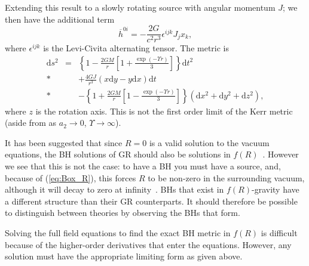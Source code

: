 \documentclass[aps,prd,amsfonts,amssymb,amsmath,nofootinbib,reprint,showpacs]{revtex4-1}
\newcommand{\eqnref}[1]{(\ref{eq:#1})}
\newcommand{\dd}{\ensuremath{\text{d}}}
\begin{document}
Extending this result to a slowly rotating source with angular momentum $J$; we then have the additional term~\cite{Hobson2006}
\begin{equation}
\overline{h}^{0i} = -\frac{2G}{c^2r^3} \epsilon^{ijk}J_j x_k,
\end{equation}
where $\epsilon^{ijk}$ is the Levi-Civita alternating tensor. The metric is
\begin{eqnarray}
\dd s^2 & = & \left\{1-\frac{2GM}{r}\left[1 + \frac{\exp(- \Upsilon r)}{3}\right]\right\}\dd t^2 \nonumber \\*
& & + {} \frac{4GJ}{r^3}\left(x\dd y - y\dd x\right)\dd t \nonumber \\*
& & - {} \left\{1 +\frac{2GM}{r}\left[1 - \frac{\exp(- \Upsilon r)}{3}\right]\right\}\left(\dd x^2 + \dd y^2 + \dd z^2\right),
\end{eqnarray}
where $z$ is the rotation axis. This is not the first order limit of the Kerr metric (aside from as $a_2 \rightarrow 0$, $\Upsilon \rightarrow \infty$).

It has been suggested that since $R = 0$ is a valid solution to the vacuum equations, the BH solutions of GR should also be solutions in $f(R)$~\cite{Psaltis2008, Barausse2008}. However we see that this is not the case: to have a BH you must have a source, and, because of \eqnref{Box_R}, this forces $R$ to be non-zero in the surrounding vacuum, although it will decay to zero at infinity~\cite{Olmo2007c}. BHs that exist in $f(R)$-gravity have a different structure than their GR counterparts. It should therefore be possible to distinguish between theories by observing the BHs that form.

Solving the full field equations to find the exact BH metric in $f(R)$ is difficult because of the higher-order derivatives that enter the equations. However, any solution must have the appropriate limiting form as given above.
\end{document}
